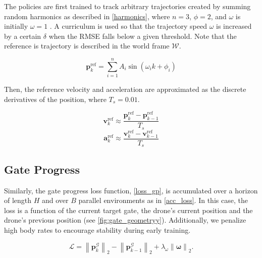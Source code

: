 
The policies are first trained to track arbitrary trajectories created by summing random harmonics as described in \eqref{harmonics}, where $n=3$, $\phi=2$, and $\omega$ is initially $\omega=1$ . 
A curriculum is used so that the trajectory speed $\omega$  is increased by a certain $\delta$ when the \ac{RMSE} falls below a given threshold.
Note that the reference is trajectory is described in the world frame $\mathcal{W}$.

\begin{equation}\label{harmonics}
    \mathbf{p}_k^{\text{ref}} = \sum_{i=1}^{n}A_i\sin{\left(\omega_i k + \phi_i\right)}
\end{equation}

Then, the reference velocity and acceleration are approximated as the discrete derivatives of the position, where $T_s=0.01$.

\begin{equation}
        \mathbf{v}_k^\text{ref} \approx \frac{\mathbf{p}_{k}^\text{ref} - \mathbf{p}_{k-1}^\text{ref}}{T_s}
\end{equation}
\begin{equation}
        \mathbf{a}_k^\text{ref} \approx \frac{\mathbf{v}_{k}^\text{ref} - \mathbf{v}_{k-1}^\text{ref}}{T_s}
\end{equation}



\subsection{Gate Progress}\label{gate-prog}

Similarly, the gate progress loss function, \eqref{loss_gp}, is accumulated over a horizon of length $H$ and over $B$ parallel environments as in \eqref{acc_loss}.
In this case, the loss is a function of the current target gate, the drone's current position and the drone's previous position (see \autoref{fig:gate_geometryy}).
Additionally, we penalize high body rates to encourage stability during early training.

\begin{equation}\label{loss_gp}
\mathcal{L} =  \left\| \mathbf{p}_{k}^{\mathcal{G}}  \right\|_2 - \left\| \mathbf{p}_{k-1}^{\mathcal{G}} \right\|_2 + \lambda_\omega \left\| \boldsymbol{\omega} \right\|_2.
\end{equation}

